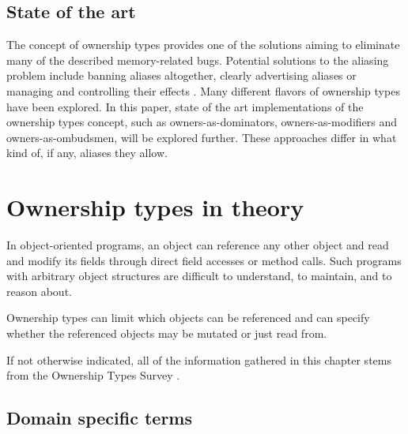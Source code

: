 \documentclass[sigplan,11pt,nonacm]{acmart}
\begin{document}


\subsection{State of the art}
\label{sec:state-of-the-art}


The concept of ownership types provides one of the solutions aiming to eliminate many of the described memory-related bugs.
Potential solutions to the aliasing problem include banning aliases altogether, clearly advertising aliases or managing and controlling their effects \cite{ownership-types-survey}.
Many different flavors of ownership types have been explored.
In this paper, state of the art implementations of the ownership types concept, such as owners-as-dominators, owners-as-modifiers and owners-as-ombudsmen, will be explored further.
These approaches differ in what kind of, if any, aliases they allow.



\section{Ownership types in theory}
\label{sec:theory}

In object-oriented programs, an object can reference any other object and read and modify its fields through direct field accesses or method calls.
Such programs with arbitrary object structures are difficult to understand, to maintain, and to reason about. \cite{lightweight-ownership}

Ownership types can limit which objects can be referenced and can specify whether the referenced objects may be mutated or just read from.

If not otherwise indicated, all of the information gathered in this chapter stems from the Ownership Types Survey \cite{ownership-types-survey}.

\subsection{Domain specific terms}
\label{sec:domain-specific-terms}
\end{document}
